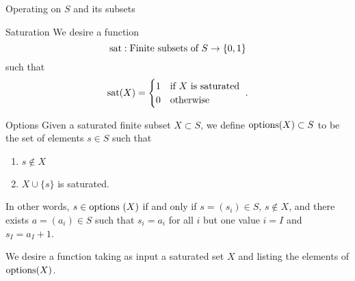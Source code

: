\documentclass{article}
\begin{document}
\begin{section}{Operating on $S$ and its subsets}
\begin{subsubsection}{Saturation}
 We desire a function 
 $$\hbox{sat}: \hbox{Finite subsets of $S$} \rightarrow \{0, 1\}$$ such that 
$$\hbox{sat}(X)  = \begin{cases}1 & \hbox{if $X$ is saturated }\cr 0&\hbox{otherwise}\end{cases}.$$

\end{subsubsection}
\begin{subsubsection}{Options}
Given a saturated finite subset  $X\subset S$, we define   $\hbox{options}(X) \subset S$  to be the set of elements $s\in S$ such that 
\begin{enumerate}
\item $s\notin X$
\item $X\cup \{s\}$ is saturated.   
\end{enumerate}
In other words,  $s\in \hbox{options }(X)$ if and only if $s=(s_i) \in S$, $s \notin X$, and there exists $a=(a_i) \in S$ such that $s_i= a_i$ for all $i$ but one value $i=I$ and $s_I=a_I+1$.  



We desire a function  taking as input a saturated set $X$ and listing the elements of $\hbox{options}(X)$.



\end{subsubsection}

\end{section}
\end{document}
